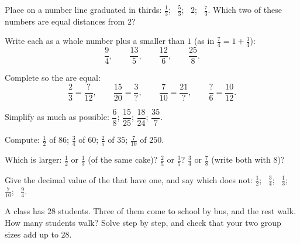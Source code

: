 \begin{exercise}[$\star$]\label{exo:g6:fractions:3}
Place on a number line graduated in thirds: $\frac13$; \ $\frac53$;
\ $2$; \ $\frac73$. Which two of these numbers are equal distances from
$2$?
\end{exercise}

\begin{exercise}[$\star$]\label{exo:g6:fractions:4}
Write each  as a whole number plus a  smaller than $1$
(as in $\frac74 = 1 + \frac34$):
\[
\frac{9}{4}, \qquad \frac{13}{5}, \qquad \frac{12}{6}, \qquad
\frac{25}{8} .
\]
\end{exercise}

\begin{exercise}[$\star$]\label{exo:g6:fractions:5}
Complete so the  are equal:
\[
\frac{2}{3} = \frac{?}{12}, \qquad
\frac{15}{20} = \frac{3}{?}, \qquad
\frac{7}{10} = \frac{21}{?}, \qquad
\frac{?}{6} = \frac{10}{12}.
\]
\end{exercise}

\begin{exercise}[$\star$]\label{exo:g6:fractions:6}
Simplify as much as possible: $\dfrac{6}{8}$; \quad $\dfrac{15}{25}$;
\quad $\dfrac{18}{24}$; \quad $\dfrac{35}{7}$.
\end{exercise}

\begin{exercise}[$\star$]\label{exo:g6:fractions:7}
Compute: $\frac12$ of $86$; \quad $\frac34$ of $60$; \quad $\frac25$ of
$35$; \quad $\frac{7}{10}$ of $250$.
\end{exercise}

\begin{exercise}[$\star$]\label{exo:g6:fractions:8}
Which is larger: $\frac12$ or $\frac13$ (of the same cake)? $\frac25$
or $\frac35$? $\frac34$ or $\frac78$ (write both with 
$8$)?
\end{exercise}

\begin{exercise}[$\star\star$]\label{exo:g6:fractions:9}
Give the decimal value of the  that have one, and say which
 does not: $\frac12$; \ $\frac34$; \ $\frac13$; \ $\frac{7}{10}$;
\ $\frac{9}{4}$.
\end{exercise}

\begin{exercise}[$\star\star$]\label{exo:g6:fractions:10}
A class has $28$ students. Three  of them come to school by
bus, and the rest walk. How many students walk? Solve step by step, and
check that your two group sizes add up to $28$.
\end{exercise}

